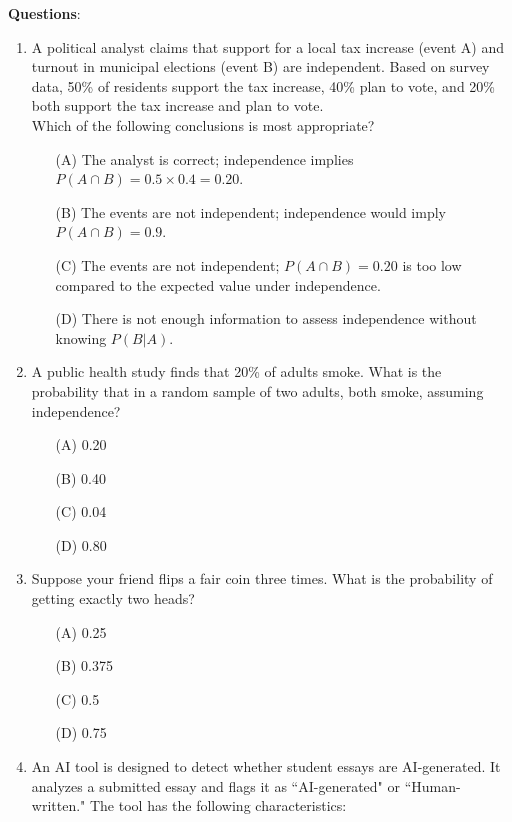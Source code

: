 \documentclass{article}
\begin{document}
\textbf{Questions}:
\begin{enumerate}
   \item A political analyst claims that support for a local tax increase (event A) and turnout in municipal elections (event B) are independent. Based on survey data, 50\% of residents support the tax increase, 40\% plan to vote, and 20\% both support the tax increase and plan to vote.  \\
    Which of the following conclusions is most appropriate?
    \begin{enumerate}
        \item[(A)] The analyst is correct; independence implies \( P(A \cap B) = 0.5 \times 0.4 = 0.20 \).
        \item[(B)] The events are not independent; independence would imply \( P(A \cap B) = 0.9 \).
        \item[(C)] The events are not independent; \( P(A \cap B) = 0.20 \) is too low compared to the expected value under independence.
        \item[(D)] There is not enough information to assess independence without knowing \( P(B|A) \).
    \end{enumerate}
    \item A public health study finds that 20\% of adults smoke. What is the probability that in a random sample of two adults, both smoke, assuming independence?
    \begin{enumerate}
        \item[(A)] 0.20  
        \item[(B)] 0.40  
        \item[(C)] 0.04  
        \item[(D)] 0.80  
    \end{enumerate}
    \item Suppose your friend flips a fair coin three times. What is the probability of getting exactly two heads? 
    \begin{enumerate}
        \item[(A)] 0.25  
        \item[(B)] 0.375  
        \item[(C)] 0.5  
        \item[(D)] 0.75  
    \end{enumerate}
\item An AI tool is designed to detect whether student essays are AI-generated. It analyzes a submitted essay and flags it as ``AI-generated" or ``Human-written." The tool has the following characteristics:

\end{enumerate}
\end{document}
